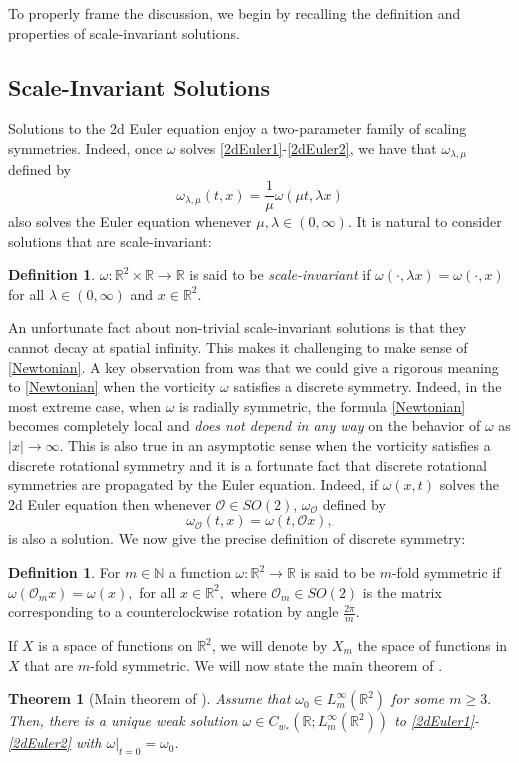 \documentclass[10pt]{article}
\numberwithin{equation}{section}
\theoremstyle{plain}
\newtheorem*{theorem*}{Theorem}
\theoremstyle{definition}
\newtheorem{definition}[lemma]{Definition}
\numberwithin{equation}{section}
\begin{document}
To properly frame the discussion, we begin by recalling the definition and properties of scale-invariant solutions.
\subsection{Scale-Invariant Solutions}
Solutions to the 2d Euler equation enjoy a two-parameter family of scaling symmetries. Indeed, once $\omega$ solves \eqref{2dEuler1}-\eqref{2dEuler2}, we have that $\omega_{\lambda,\mu}$ defined by 
\[\omega_{\lambda,\mu}(t,x)=\frac{1}{\mu}\omega(\mu t,\lambda x)\] also solves the Euler equation whenever $\mu,\lambda\in (0,\infty).$ It is natural to consider solutions that are scale-invariant:
\begin{definition}
$\omega:\mathbb{R}^2\times\mathbb{R}\rightarrow\mathbb{R}$ is said to be \emph{scale-invariant} if $\omega(\cdot,\lambda x)=\omega(\cdot,x)$ for all $\lambda\in (0,\infty)$ and $x\in\mathbb{R}^2.$
\end{definition}
An unfortunate fact about non-trivial scale-invariant solutions is that they cannot decay at spatial infinity. This makes it challenging to make sense of \eqref{Newtonian}. A key observation from \cite{EJ-symmetries} was that we could give a rigorous meaning to \eqref{Newtonian} when the vorticity $\omega$ satisfies a discrete symmetry. Indeed, in the most extreme case, when $\omega$ is radially symmetric, the formula \eqref{Newtonian} becomes completely local and \emph{does not depend in any way} on the behavior of $\omega$ as $|x|\rightarrow\infty.$ This is also true in an asymptotic sense when the vorticity satisfies a discrete rotational symmetry and it is a fortunate fact that discrete rotational symmetries are propagated by the Euler equation.  Indeed, if $\omega(x,t)$ solves the 2d Euler equation then whenever $\mathcal{O}\in SO(2)$, $\omega_{\mathcal{O}}$ defined by 
\[\omega_{\mathcal{O}}(t,x)=\omega(t,\mathcal{O}x),\] is also a solution. We now give the precise definition of discrete symmetry:
\begin{definition} For $m\in\mathbb{N}$ a function
$\omega:\mathbb{R}^2\rightarrow\mathbb{R}$ is said to be $m$-fold symmetric if $\omega(\mathcal{O}_{m}x)=\omega(x),$ for all $x\in\mathbb{R}^2,$ where $\mathcal{O}_m\in SO(2)$ is the matrix corresponding to a counterclockwise rotation by angle $\frac{2\pi}{m}.$
\end{definition}
\noindent If $X$ is a space of functions on $\mathbb{R}^2$, we will denote by $X_m$ the space of functions in $X$ that are $m$-fold symmetric. 
We will now state the main theorem of \cite{EJ-symmetries}.
\begin{theorem*}[Main theorem of \cite{EJ-symmetries}]\label{EJSITheorem}
Assume that $\omega_0\in L^\infty_m(\mathbb{R}^2)$ for some $m\geq 3.$ Then, there is a unique weak solution $\omega\in C_{w_*}(\mathbb{R}; L^\infty_m(\mathbb{R}^2))$ to \eqref{2dEuler1}-\eqref{2dEuler2} with $\omega|_{t=0}=\omega_0.$
\end{theorem*}
\end{document}

